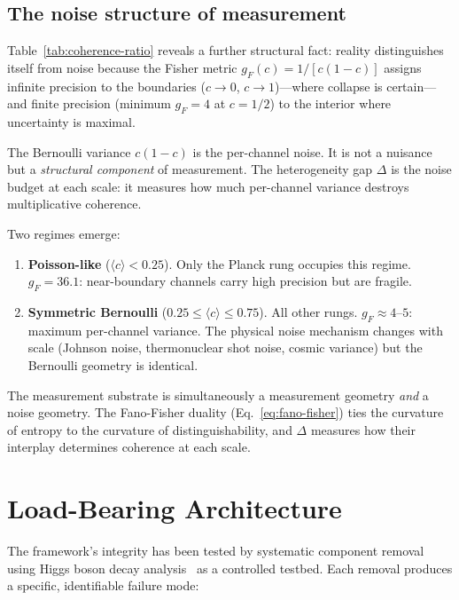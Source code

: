 \documentclass[
  aps,
  prd,
  twocolumn,
  superscriptaddress,
  nofootinbib,
  floatfix
]{revtex4-2}
\newcommand{\gF}{g_{\!F}}
\begin{document}
\subsection{The noise structure of measurement}\label{sec:noise-structure}

Table~\ref{tab:coherence-ratio} reveals a further structural fact:
reality distinguishes itself from noise because the Fisher metric
$\gF(c) = 1/[c(1{-}c)]$ assigns infinite precision to the boundaries
($c \to 0$, $c \to 1$)---where collapse is certain---and finite
precision (minimum $\gF = 4$ at $c = 1/2$) to the interior where
uncertainty is maximal.

The Bernoulli variance $c(1{-}c)$ is the per-channel noise.  It is
not a nuisance but a \emph{structural component} of measurement.
The heterogeneity gap $\Delta$ is the noise budget at each scale:
it measures how much per-channel variance destroys multiplicative
coherence.

Two regimes emerge:
\begin{enumerate}[leftmargin=*,label=(\alph*)]
\item \textbf{Poisson-like} ($\langle c \rangle < 0.25$).  Only
  the Planck rung occupies this regime.  $\gF = 36.1$: near-boundary
  channels carry high precision but are fragile.

\item \textbf{Symmetric Bernoulli} ($0.25 \leq \langle c \rangle
  \leq 0.75$).  All other rungs.  $\gF \approx 4$--$5$: maximum
  per-channel variance.  The physical noise mechanism changes with
  scale (Johnson noise, thermonuclear shot noise, cosmic variance)
  but the Bernoulli geometry is identical.
\end{enumerate}

\noindent The measurement substrate is simultaneously a measurement
geometry \emph{and} a noise geometry.  The Fano-Fisher duality
(Eq.~\ref{eq:fano-fisher}) ties the curvature of entropy to the
curvature of distinguishability, and $\Delta$ measures how their
interplay determines coherence at each scale.

\section{Load-Bearing Architecture}\label{sec:load-bearing}

The framework's integrity has been tested by systematic component
removal using Higgs boson decay analysis~\cite{umcpmetadatarepo} as
a controlled testbed.  Each removal produces a specific, identifiable
failure mode:
\end{document}
